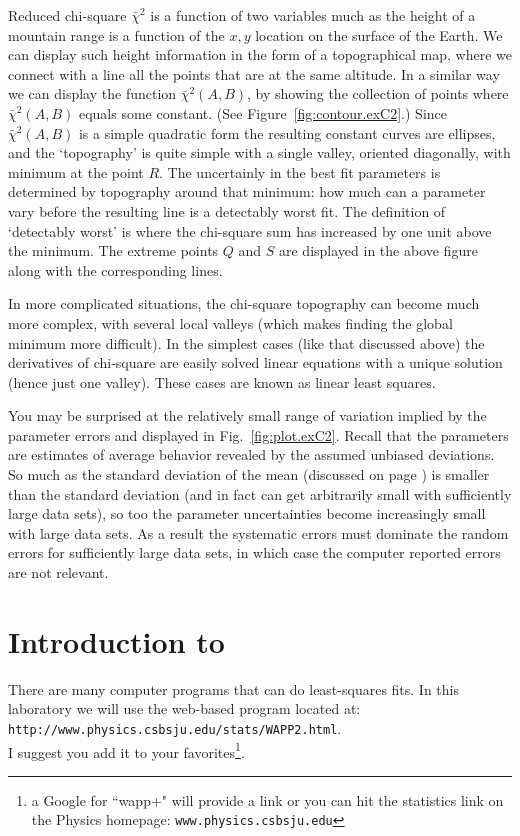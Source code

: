 Reduced chi-square $\bar{\chi}^{2}$ is a function of two variables much as
the height of a mountain range is a function of the $x,y$ location on the surface of the Earth.
We can display such height information in the form of a topographical map, where we
connect with a line all the points that are at the same altitude.  In a similar way
we can display the function $\bar{\chi}^{2}(A,B)$, by showing the collection of
points where $\bar{\chi}^{2}(A,B)$ equals some constant.  (See Figure~\ref{fig:contour.exC2}.)
Since $\bar{\chi}^{2}(A,B)$
is a simple quadratic form the resulting constant curves are ellipses,
and the `topography' is quite simple with a single valley, oriented
diagonally, with minimum at the point $R$.  The uncertainly in the best fit
parameters is determined by topography around that minimum: how much
can a parameter vary before the resulting line is a detectably worst fit.
The definition of `detectably worst' is where the chi-square sum has increased
by one unit above the minimum.  The extreme points $Q$ and $S$ are
displayed in the above figure along with the corresponding lines.

In more complicated situations, the chi-square topography can become much more
complex, with several local valleys (which makes finding the global
minimum more difficult).  In the simplest cases (like
that discussed above) the derivatives of chi-square are easily solved linear 
equations with a unique solution (hence just one valley).  These cases are
known as linear least squares.

\label{par:small.error}You may be surprised at the relatively small range of variation implied by the
parameter errors and displayed in Fig.~\ref{fig:plot.exC2}.  Recall that the
parameters are estimates of average behavior revealed by the assumed
unbiased deviations.  So much as the standard deviation of the mean
(discussed on page \pageref{sdev.mean}) is smaller than the
standard deviation (and in fact can get arbitrarily small with sufficiently
large data sets), so too the parameter uncertainties become increasingly
small with large data sets.  As a result the systematic errors must dominate
the random errors for sufficiently large data sets, in which case the computer reported
errors are not relevant. 

\section*{Introduction to \WAPP}

There are many computer programs that can do least-squares fits.  In
this laboratory we will use the web-based program \WAPP located at:\\
\verb+http://www.physics.csbsju.edu/stats/WAPP2.html+.\\ I suggest you add
it to your favorites\footnote{a Google for ``wapp+" will provide a link or
you can hit the statistics link on the Physics homepage: {\tt www.physics.csbsju.edu}}.

